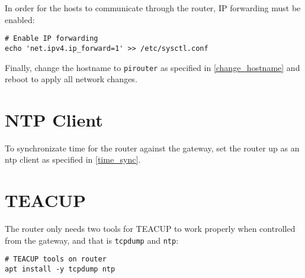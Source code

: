 In order for the hosts to communicate through the router, IP forwarding must be enabled:

\begin{lstlisting}
# Enable IP forwarding
echo 'net.ipv4.ip_forward=1' >> /etc/sysctl.conf
\end{lstlisting}

Finally, change the hostname to \lstinline{pirouter} as specified in \ref{change_hostname} and reboot to apply all network changes.


\section{NTP Client}

To synchronizate time for the router against the gateway, set the router up as an \gls{ntp} client as specified in \ref{time_sync}.


\section{TEACUP}

The router only needs two tools for TEACUP to work properly when controlled from the gateway, and that is \lstinline{tcpdump} and \lstinline{ntp}:

\begin{lstlisting}
# TEACUP tools on router
apt install -y tcpdump ntp
\end{lstlisting}